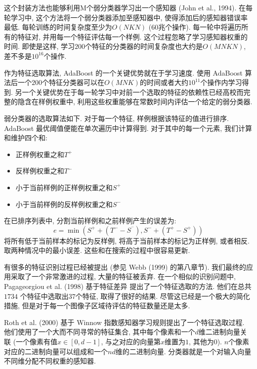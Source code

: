 \documentclass[utf8]{ctexart}
\begin{document}
这个封装方法也能够利用M个弱分类器学习出一个感知器 (John et al., 1994). 在每轮学习中, 这个方法将一个弱分类器添加至感知器中, 使得添加后的感知器错误率最低. 每轮训练的时间复杂度至少为$O(NKN)$ ($60$兆个操作). 每一轮中将遍历所有的特征对, 并用每一个特征评估每一个样例.
这个过程忽略了学习感知器权重的时间. 即使是这样, 学习$200$个特征的分类器的时间复杂度也大约是$O(MNKN)$, 差不多是$10^{16}$个操作.

作为特征选取算法, AdaBoost 的一个关键优势就在于学习速度. 使用 AdaBoost 算法后一个$200$个特征分类器可以在$O(MNK)$的时间或者大约$10^{11}$个操作内学习得到. 另一个关键优势在于每一轮学习中对前一个选取的特征的依赖性已经高校而完整的隐含在样例权重中, 利用这些权重能够在常数时间内评估一个给定的弱分类器.

弱分类器的选取算法如下. 对于每一个特征, 样例根据该特征的值进行排序. AdaBoost 最优阈值便能在单次遍历中计算得到. 对于其中的每一个元素, 我们计算和维护四个和:
\begin{itemize}
\item 正样例权重之和$T^+$
\item 反样例权重之和$T^-$
\item 小于当前样例的正样例权重之和$S^+$
\item 小于当前样例的反样例权重之和$S^-$
\end{itemize}
在已排序列表中, 分割当前样例和之前样例产生的误差为:
\[
e=\min(S^++(T^--S^^-),S^-+(T^+-S^+))
\]
将所有低于当前样本的标记为反样例, 将高于当前样本的标记为正样例, 或者相反. 取两种情况中的最小误差. 这些和在搜索的过程中很容易更新.

有很多的特征识别过程已经被提出 (参见 Webb (1999) 的第八章节). 我们最终的应用采取了一个非常激进的过程, 大量的特征被丢弃. 在一个相似的识别问题中,  Pagageorgiou et al. (1998) 基于特征差异
提出了一个特征选取的方法. 他们在总共 $1734$ 个特征中选取出$37$个特征, 取得了很好的结果. 尽管这已经是一个极大的简化措施, 但是对于每一个图像子区域待评估的特征数量还是太多.

Roth et al. (2000) 基于 Winnow 指数感知器学习规则提出了一个特征选取过程. 他们使用了一个大而不同寻常的特征集合, 其中每个像素和一个$d$维二进制向量关联 (一个像素有值$x\in[0, d-1]$, 与之对应的向量第$x$维置为$1$, 其他为$0$). $n$个像素对应的二进制向量可以组成和一个$nd$维的二进制向量. 分类器就是一个对输入向量不同维分配不同权重的感知器. 
\end{document}
